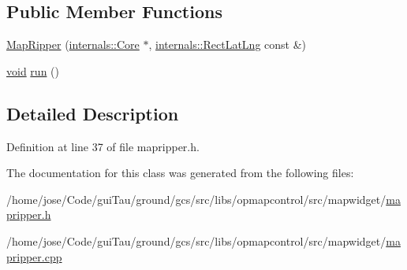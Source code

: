 \subsection*{Public Member Functions}
\begin{DoxyCompactItemize}
\item 
\hyperlink{group___o_p_map_widget_ga8c3645377b4deb3dc4d498de823ff3fd}{Map\-Ripper} (\hyperlink{classinternals_1_1_core}{internals\-::\-Core} $\ast$, \hyperlink{structinternals_1_1_rect_lat_lng}{internals\-::\-Rect\-Lat\-Lng} const \&)
\item 
\hyperlink{group___u_a_v_objects_plugin_ga444cf2ff3f0ecbe028adce838d373f5c}{void} \hyperlink{group___o_p_map_widget_gab955ee8425cb4937440d817492b47a88}{run} ()
\end{DoxyCompactItemize}


\subsection{Detailed Description}


Definition at line 37 of file mapripper.\-h.



The documentation for this class was generated from the following files\-:\begin{DoxyCompactItemize}
\item 
/home/jose/\-Code/gui\-Tau/ground/gcs/src/libs/opmapcontrol/src/mapwidget/\hyperlink{mapripper_8h}{mapripper.\-h}\item 
/home/jose/\-Code/gui\-Tau/ground/gcs/src/libs/opmapcontrol/src/mapwidget/\hyperlink{mapripper_8cpp}{mapripper.\-cpp}\end{DoxyCompactItemize}
